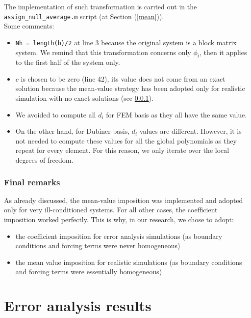 \documentclass[a4paper,11pt]{article}
\begin{document}
\noindent The implementation of such transformation is carried out in the \texttt{assign\_null\_average.m} script (at Section (\ref{mean})).\\
\vspace{2mm}
\noindent Some comments:
\begin{itemize}
	\item \texttt{Nh = length(b)/2} at line 3 because the original system is a block matrix system. We remind that this transformation concerns only $\phi_i$, then it applies to the first half of the system only.
	\item $c$ is chosen to be zero (line 42), its value does not come from an exact solution because the mean-value strategy has been adopted only for realistic simulation with no exact solutions (see \ref{uniqueness_results}). 
	\item We avoided to compute all $d_i$ for FEM basis as they all have the same value.
	\item On the other hand, for Dubiner basis, $d_i$ values are different. However, it is not needed to compute these values for all the global polynomials as they repeat for every element. For this reason, we only iterate over the local degrees of freedom.
\end{itemize}


\subsubsection{Final remarks} \label{uniqueness_results}
\noindent As already discussed, the mean-value imposition was implemented and adopted only for very ill-conditioned systems. For all other cases, the coefficient imposition worked perfectly. This is why, in our research, we chose to adopt:
\begin{itemize}
	\item the coefficient imposition for error analysis simulations (as boundary conditions and forcing terms were never homogeneous)
	\item the mean value imposition for realistic simulations (as boundary conditions and forcing terms were essentially homogeneous)
\end{itemize}
\newpage
\section{Error analysis results} \label{error_analysis}
\end{document}
